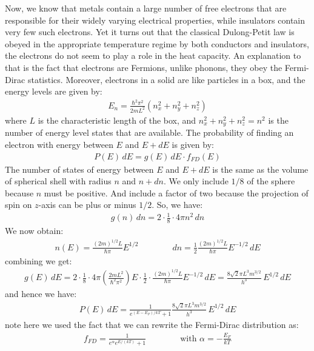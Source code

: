 \documentclass[11pt]{article}
\theoremstyle{break}
\theoremstyle{break}
\begin{document}
Now, we know that metals contain a large number of free electrons that are responsible for their widely varying electrical properties, while insulators contain very few such electrons. Yet it turns out that the classical Dulong-Petit law is obeyed in the appropriate temperature regime  by both conductors and insulators, the  electrons  do not  seem  to  play  a  role in the heat capacity. An explanation to that is the fact that electrons are Fermions, unlike phonons, they obey the Fermi-Dirac statistics. Moreover, electrons in a solid are like particles in a box, and the energy levels are given by:
\begin{align*}
E_n = \frac{\hbar^2 \pi^2}{2mL^2}(n_x^2 + n_y^2 + n_z^2)
\end{align*}
where $L$ is the characteristic length of the box, and $n_x^2 + n_y^2 + n_z^2 = n^2$ is the number of energy level states that are available. The probability of finding an electron with energy between $E$ and $E+dE$ is given by:
\begin{align*}
P(E) \, dE = g(E) \, dE \cdot f_{FD}(E)
\end{align*}
The number of states of energy between $E$ and $E+dE$ is the same as the volume of spherical shell with radius $n$ and $n+dn$. We only include $1/8$ of the sphere because $n$ must be positive. And include a factor of two because the projection of spin on $z$-axis can be plus or minus $1/2$. So, we have:
\begin{align*}
g(n)\, dn  = 2\cdot\frac{1}{8}\cdot 4\pi n^2 \, dn
\end{align*}
We now obtain:
\begin{align*}
n(E) = \frac{(2m)^{1/2}L}{\hbar \pi}E^{1/2}\qquad\qquad dn = \frac{1}{2}\frac{(2m)^{1/2}L}{\hbar \pi}E^{-1/2}\, dE
\end{align*}
combining we get:
\begin{align*}
g(E) \, dE = 2\cdot \frac{1}{8}\cdot 4\pi \left( \frac{2mL^2}{\hbar^2 \pi^2}\right) E \cdot \frac{1}{2}\cdot \frac{(2m)^{1/2}L}{\hbar \pi}E^{-1/2}\, dE = \frac{8 \sqrt{2}\pi L^3 m^{3/2}}{h^3}\, E^{1/2}\, dE
\end{align*}
and hence we have:
\begin{align*}
P(E)\, dE =  \frac{1}{e^{(E-E_F)/kT}+1}  \frac{8 \sqrt{2}\pi L^3 m^{3/2}}{h^3}\, E^{1/2}\, dE 
\end{align*}
note here we used the fact that we can rewrite the Fermi-Dirac distribution as:
\begin{align*}
f_{FD} = \frac{1}{e^\alpha e^{E/(kT)}+1}\qquad\qquad \text{with }\alpha = -\frac{E_F}{kT}
\end{align*}
\end{document}
